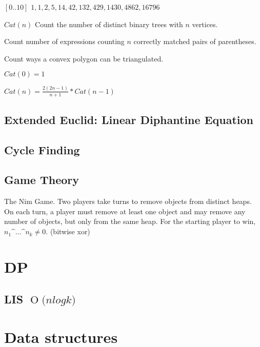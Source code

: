 \documentclass[twocolumn,8pt]{article}
\newcommand{\BigO}[1]{\ensuremath{\operatorname{O}\bigl(#1\bigr)}}
\begin{document}
$[0..10]$ $ 1, 1, 2, 5, 14, 42, 132, 429, 1430, 4862, 16796$

\begin{enumerate*}
    \item $Cat(n)$ Count the number of distinct binary trees with $n$ vertices.
    \item Count number of expressions counting $n$ correctly matched pairs of parentheses.
    \item Count ways a convex polygon can be triangulated.
\end{enumerate*}

$Cat(0) = 1$

$Cat(n) = \frac{2(2n - 1)}{n + 1} * Cat(n - 1)$

\subsection{Extended Euclid: Linear Diphantine Equation}


\subsection{Cycle Finding}


\subsection{Game Theory}

The Nim Game. Two players take turns to remove objects from distinct heaps. On each turn, a player must remove at least one object and may remove any number of objects, but only from the same heap. For the starting player to win, $n_1 \text{\textasciicircum{}} ... \text{\textasciicircum{}} n_k \neq 0$. (bitwise xor)


\section{DP}

\subsection{LIS $\BigO{n log k}$}



\section{Data structures}
\end{document}
